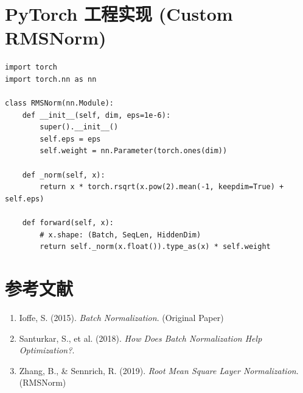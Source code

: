 \documentclass[12pt, a4paper]{article}
\begin{document}
\section{PyTorch 工程实现 (Custom RMSNorm)}
\begin{lstlisting}
import torch
import torch.nn as nn

class RMSNorm(nn.Module):
    def __init__(self, dim, eps=1e-6):
        super().__init__()
        self.eps = eps
        self.weight = nn.Parameter(torch.ones(dim))

    def _norm(self, x):
        return x * torch.rsqrt(x.pow(2).mean(-1, keepdim=True) + self.eps)

    def forward(self, x):
        # x.shape: (Batch, SeqLen, HiddenDim)
        return self._norm(x.float()).type_as(x) * self.weight
\end{lstlisting}

\section{参考文献}
\begin{enumerate}
    \item Ioffe, S. (2015). \textit{Batch Normalization}. (Original Paper)
    \item Santurkar, S., et al. (2018). \textit{How Does Batch Normalization Help Optimization?}.
    \item Zhang, B., \& Sennrich, R. (2019). \textit{Root Mean Square Layer Normalization}. (RMSNorm)
\end{enumerate}
\end{document}
